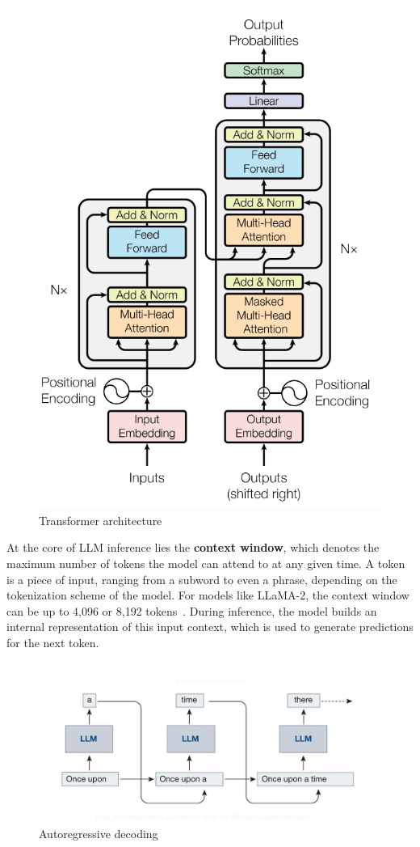 \begin{figure}[h]
    \centering
    \includegraphics[width=0.4\linewidth]{images/transformer-architecture.png}
    \caption{Transformer architecture ~\cite{vaswani2017attention}}
    \label{fig:transformer_architecture}
\end{figure}
At the core of LLM inference lies the \textbf{context window}, which denotes the maximum number of tokens the model can attend to at any given time. A token is a piece of input, ranging from a subword to even a phrase, depending on the tokenization scheme of the model. For models like LLaMA-2, the context window can be up to 4,096 or 8,192 tokens~\cite{touvron2023llama}. During inference, the model builds an internal representation of this input context, which is used to generate predictions for the next token.


\begin{figure}[h]
    \centering
    \includegraphics[width=0.6\linewidth]{images/autoregressive-decoding.png}
    \caption{Autoregressive decoding ~\cite{nabi2024all}}
    \label{fig:autoregressive_decoding}
\end{figure}

